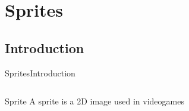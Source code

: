 \documentclass[10pt,compress]{beamer} %
\begin{document}
\section{Sprites}
\subsection{Introduction}

\begin{frame}{Sprites}{Introduction}
    \begin{columns}
	   \begin{block}{Sprite}
       A sprite is a 2D image used in videogames
	   \end{block}
   \end{columns}

    \bigskip


\end{frame}
\end{document}
